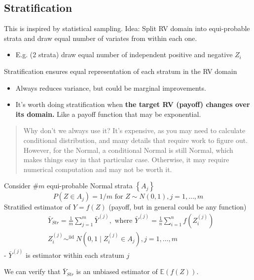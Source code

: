 \documentclass[
  oneside]{book}
\providecommand{\tightlist}{%
  \setlength{\itemsep}{0pt}\setlength{\parskip}{0pt}}
\begin{document}
\hypertarget{stratification}{%
\subsection{Stratification}\label{stratification}}

This is inspired by statistical sampling.
Idea: Split RV domain into equi-probable strata and draw equal number of variates from within each one.

\begin{itemize}
\tightlist
\item
  E.g. (2 strata) draw equal number of independent positive and negative \(Z_{i}\)
\end{itemize}

Stratification ensures equal representation of each stratum in the RV domain

\begin{itemize}
\tightlist
\item
  Always reduces variance, but could be marginal improvements.
\item
  It's worth doing stratification when \textbf{the target RV (payoff) changes over its domain.} Like a payoff function that may be exponential.
\end{itemize}

\begin{quote}
Why don't we always use it? It's expensive, as you may need to calculate conditional distribution, and many details that require work to figure out. However, for the Normal, a conditional Normal is still Normal, which makes things easy in that particular case. Otherwise, it may require numerical computation and may not be worth it.
\end{quote}

Consider \(\# m\) equi-probable Normal strata \(\left\{A_j\right\}\)
\[
P\left(Z \in A_j\right)=1 / m \text { for } Z \sim N(0,1), j=1, \ldots, m
\]
Stratified estimator of \(Y=f(Z)\) (payoff, but in general could be any function)
\[
\begin{aligned}
& \bar{Y}_{S t r}=\frac{1}{m} \sum_{j=1}^m \bar{Y}^{(j)}, \text { where } \bar{Y}^{(j)}=\frac{1}{n} \sum_{i=1}^n f\left(Z_i^{(j)}\right) \\
& Z_i^{(j)} \sim^{\text {iid }} N\left(0,1 \mid Z_i^{(j)} \in A_j\right), j=1, \ldots, m
\end{aligned}
\]
- \(\bar{Y}^{(j)}\) is estimator within each stratum \(j\)

We can verify that \(\bar{Y}_{Str}\) is an unbiased estimator of \(\mathbb{E}(f(Z))\).
\end{document}
